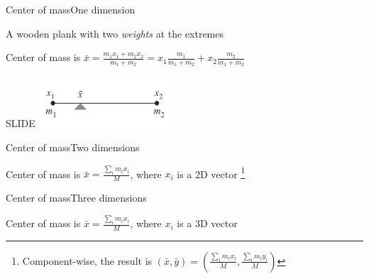 \documentclass{beamer}
\begin{document}
\begin{slide}{Center of mass}{One dimension}{
\item A wooden plank with two \textit{weights} at the extremes
\item Center of mass is $\bar x = \frac{m_1 x_1 + m_2 x_2}{m_1 + m_2} = x_1 \frac{m_1}{m_1+m_2} + x_2 \frac{m_2}{m_1+m_2}$
}\end{slide}

\begin{frame}{SLIDE}
\center
\includegraphics[width=5cm]{Pics/Fig2_15.png}
\end{frame}


\begin{slide}{Center of mass}{Two dimensions}{
\item Center of mass is $\bar x = \frac{\sum_i m_i x_i}{M}$, where $x_i$ is a 2D vector \footnote{Component-wise, the result  is $(\bar x,\bar y) = (\frac{\sum_i m_i x_i}{M},\frac{\sum_i m_i y_i}{M})$}
}\end{slide}

\begin{slide}{Center of mass}{Three dimensions}{
\item Center of mass is $\bar x = \frac{\sum_i m_i x_i}{M}$, where $x_i$ is a 3D vector
}\end{slide}
\end{document}
